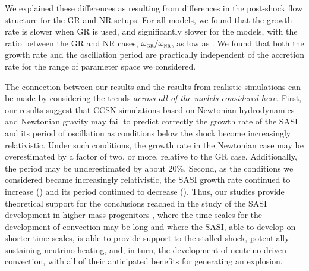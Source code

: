 We explained these differences as resulting from differences in the post-shock
flow structure for the GR and NR setups.
For all models, we found that the
growth rate is slower when GR is used,
and significantly slower for the
 models,
with the ratio between the GR and NR cases, $\omega_{\textsc{gr}}/\omega_{\textsc{nr}}$, as low as
\GrowthRateRatioGRoverNRxiD.
We found that both the growth rate and the oscillation period are practically
independent of the accretion rate for the range of parameter space we
considered.

The connection between our results and the results from realistic
simulations can be made by considering the trends \emph{across all of the
models considered here}.
First, our results suggest that CCSN simulations based on Newtonian
hydrodynamics and Newtonian gravity may fail to predict correctly the growth
rate of the SASI and its period of oscillation as conditions below the shock
become increasingly relativistic.
Under such conditions, the growth rate in the Newtonian case may be
overestimated by a factor of two, or more, relative to the GR
case.
Additionally, the period may be underestimated by about 20\%.
Second, as the conditions we considered became increasingly relativistic,
the SASI growth rate continued to increase () and its period
continued to decrease ().
Thus, our studies provide theoretical support for the conclusions reached in
the study of the SASI development in higher-mass progenitors
\citep[see, e.g.,][]{hmw2013,mat2022}, where the time scales for the development
of convection may be long and where the SASI, able to develop on shorter time
scales, is able to provide support to the stalled shock,
potentially sustaining neutrino heating, and, in turn, the development of
neutrino-driven convection, with all of their anticipated benefits for
generating an explosion.

